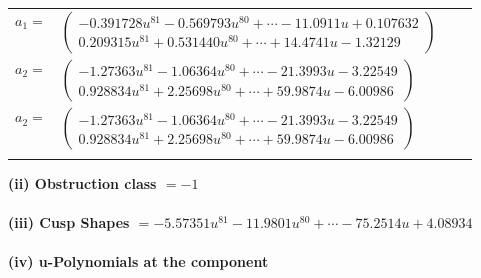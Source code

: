 \documentclass[1p]{elsarticle_modified}
\theoremstyle{definition}
\begin{document}
\begin{tabular}{m{7pt} m{180pt} m{7pt} m{180pt} }
\flushright $a_{1}=$&$\begin{pmatrix}-0.391728 u^{81}-0.569793 u^{80}+\cdots-11.0911 u+0.107632\\0.209315 u^{81}+0.531440 u^{80}+\cdots+14.4741 u-1.32129\end{pmatrix}$ \\
\flushright $a_{2}=$&$\begin{pmatrix}-1.27363 u^{81}-1.06364 u^{80}+\cdots-21.3993 u-3.22549\\0.928834 u^{81}+2.25698 u^{80}+\cdots+59.9874 u-6.00986\end{pmatrix}$\\ \flushright $a_{2}=$&$\begin{pmatrix}-1.27363 u^{81}-1.06364 u^{80}+\cdots-21.3993 u-3.22549\\0.928834 u^{81}+2.25698 u^{80}+\cdots+59.9874 u-6.00986\end{pmatrix}$\\&\end{tabular}
\flushleft \textbf{(ii) Obstruction class $= -1$}\\~\\
\flushleft \textbf{(iii) Cusp Shapes $= -5.57351 u^{81}-11.9801 u^{80}+\cdots-75.2514 u+4.08934$}\\~\\
\newpage\renewcommand{\arraystretch}{1}
\flushleft \textbf{(iv) u-Polynomials at the component}\newline \\
\end{document}
